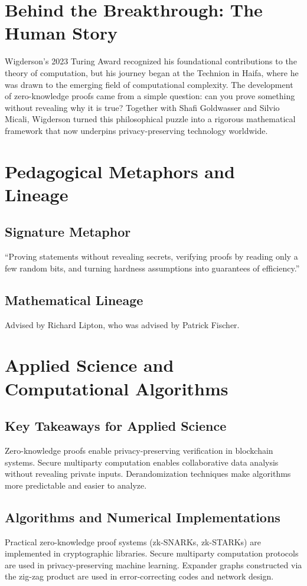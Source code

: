 \section{Behind the Breakthrough: The Human Story}

Wigderson's 2023 Turing Award recognized his foundational contributions to the theory of computation, but his journey began at the Technion in Haifa, where he was drawn to the emerging field of computational complexity. The development of zero-knowledge proofs came from a simple question: can you prove something without revealing why it is true? Together with Shafi Goldwasser and Silvio Micali, Wigderson turned this philosophical puzzle into a rigorous mathematical framework that now underpins privacy-preserving technology worldwide.

\section{Pedagogical Metaphors and Lineage}
\subsection{Signature Metaphor}
``Proving statements without revealing secrets, verifying proofs by reading only a few random bits, and turning hardness assumptions into guarantees of efficiency.''

\subsection{Mathematical Lineage}
Advised by Richard Lipton, who was advised by Patrick Fischer.

\section{Applied Science and Computational Algorithms}
\subsection{Key Takeaways for Applied Science}
Zero-knowledge proofs enable privacy-preserving verification in blockchain systems. Secure multiparty computation enables collaborative data analysis without revealing private inputs. Derandomization techniques make algorithms more predictable and easier to analyze.

\subsection{Algorithms and Numerical Implementations}
Practical zero-knowledge proof systems (zk-SNARKs, zk-STARKs) are implemented in cryptographic libraries. Secure multiparty computation protocols are used in privacy-preserving machine learning. Expander graphs constructed via the zig-zag product are used in error-correcting codes and network design.

